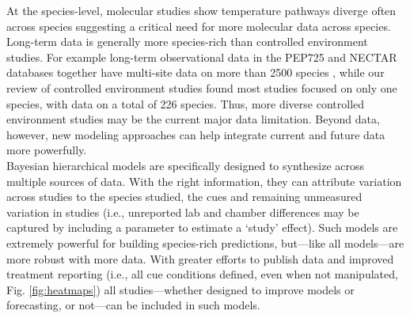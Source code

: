 \documentclass[11pt,letter]{article}
\newcommand{\R}[1]{\label{#1}\linelabel{#1}}
\begin{document}
At the species-level, molecular studies show temperature pathways diverge often across species \citep[on contrast, photoperiodic control appears highly conserved,][]{Satake2022} suggesting a critical need for more molecular data across species.\R{r2popsend} Long-term data is generally more species-rich than controlled environment studies. For example long-term observational data in the PEP725 and NECTAR databases together have multi-site data on more than 2500 species \citep{nectar,Templ2018}, while our review of controlled environment studies found most studies focused on only one species, with data on a total of 226 species. Thus, more diverse controlled environment studies may be the current major data limitation. Beyond data, however, new modeling approaches can help integrate current and future data more powerfully. \\

Bayesian hierarchical models are specifically designed to synthesize across multiple sources of data. With the right information, they can attribute variation across studies to the species studied, the cues and remaining unmeasured variation in studies (i.e., unreported lab and chamber differences may be captured by including a parameter to estimate a `study' effect). Such models are extremely powerful for building species-rich predictions, but---like all models---are more robust with more data. With greater efforts to publish data and improved treatment reporting (i.e., all cue conditions defined, even when not manipulated, Fig. \ref{fig:heatmaps}) all studies---whether designed to improve models or forecasting, or not---can be included in such models. 


\end{document}
